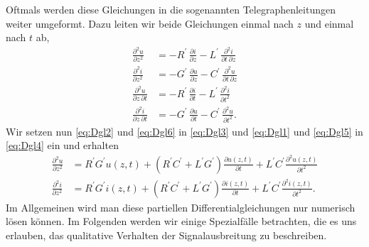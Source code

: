 \documentclass[paper=a4, parskip=half-, ngerman, fontsize=11pt]{scrreprt}
\begin{document}
Oftmals werden diese Gleichungen in die sogenannten Telegraphenleitungen weiter umgeformt. Dazu leiten wir beide
Gleichungen einmal nach $z$ und einmal nach $t$ ab,
\begin{align}
    \frac{\partial^{2} u}{\partial z^2}
    &= -R^{\prime} \, \frac{\partial i}{\partial z}
       -L^{\prime} \, \frac{\partial^2 i}{\partial t \, \partial z} \label{eq:Dgl3} \\[1ex]
    \frac{\partial^{2} i}{\partial z^2}
    &= -G^{\prime} \, \frac{\partial u}{\partial z}
       -C^{\prime} \, \frac{\partial^2 u}{\partial t \, \partial z} \label{eq:Dgl4} \\[1ex]
    \frac{\partial^{2} u}{\partial z \, \partial t}
    &= -R^{\prime} \, \frac{\partial i}{\partial t}
       -L^{\prime} \, \frac{\partial^2 i}{\partial t^{2}} \label{eq:Dgl5} \\[1ex]
    \frac{\partial^{2} i}{\partial z \, \partial t}
    &= -G^{\prime} \, \frac{\partial u}{\partial t}
       -C^{\prime} \, \frac{\partial^2 u}{\partial t^{2}}. \label{eq:Dgl6}
\end{align}
Wir setzen nun \eqref{eq:Dgl2} und \eqref{eq:Dgl6} in \eqref{eq:Dgl3} und \eqref{eq:Dgl1} und \eqref{eq:Dgl5} in
\eqref{eq:Dgl4} ein und erhalten
\begin{align}
    \frac{\partial^{2} u}{\partial z^{2}} &= R^{\prime} G^{\prime} u(z,t) + (R^{\prime} C^{\prime} + L^{\prime}
    G^{\prime}) \frac{\partial u(z, t)}{\partial t} + L^{\prime} C^{\prime} \frac{\partial^{2} u(z,t)}{\partial t^{2}}
     \label{eq:Tele1} \\[1.5ex]
    \frac{\partial^{2} i}{\partial z^{2}} &= R^{\prime} G^{\prime} i(z,t) + (R^{\prime} C^{\prime} + L^{\prime}
    G^{\prime}) \frac{\partial i(z, t)}{\partial t} + L^{\prime} C^{\prime} \frac{\partial^{2} i(z, t)}{\partial t^{2}}.
\end{align}
Im Allgemeinen wird man diese partiellen Differentialgleichungen nur numerisch lösen können. Im Folgenden werden wir
einige Spezialfälle betrachten, die es uns erlauben, das qualitative Verhalten der Signalausbreitung zu beschreiben.
\end{document}
